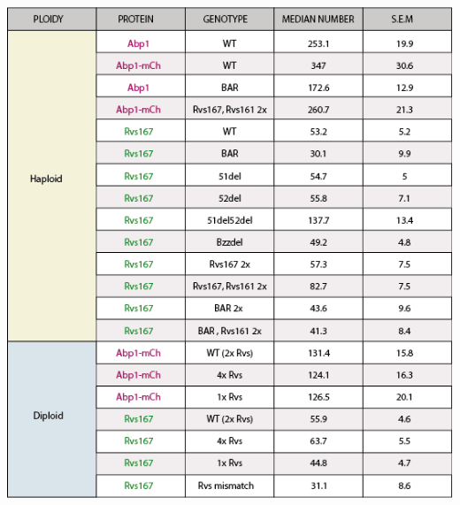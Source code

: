 \newpage
\begin{table}[H]
	\centering
	\includegraphics[width=16cm,height=25cm,keepaspectratio]{figures/results_final/table_numbers}
\end{table}

